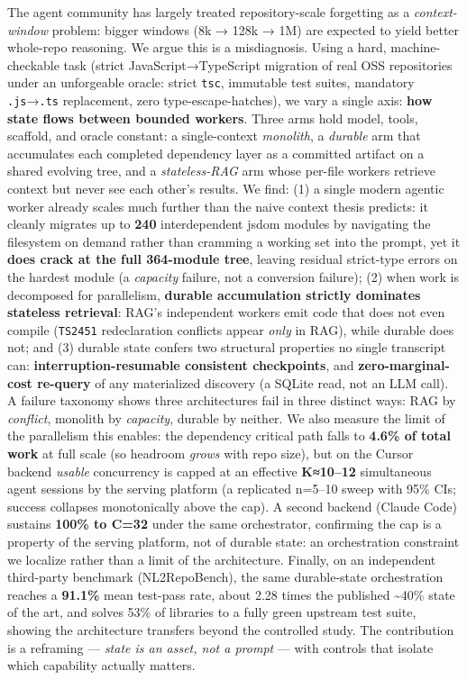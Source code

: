 \documentclass[
  10pt,
]{article}
\begin{document}
The agent community has largely treated repository-scale forgetting as a
\emph{context-window} problem: bigger windows (8k → 128k → 1M) are
expected to yield better whole-repo reasoning. We argue this is a
misdiagnosis. Using a hard, machine-checkable task (strict
JavaScript→TypeScript migration of real OSS repositories under an
unforgeable oracle: strict \texttt{tsc}, immutable test suites,
mandatory \texttt{.js}→\texttt{.ts} replacement, zero
type-escape-hatches), we vary a single axis: \textbf{how state flows
between bounded workers}. Three arms hold model, tools, scaffold, and
oracle constant: a single-context \emph{monolith}, a \emph{durable} arm
that accumulates each completed dependency layer as a committed artifact
on a shared evolving tree, and a \emph{stateless-RAG} arm whose per-file
workers retrieve context but never see each other's results. We find:
(1) a single modern agentic worker already scales much further than the
naive context thesis predicts: it cleanly migrates up to \textbf{240}
interdependent jsdom modules by navigating the filesystem on demand
rather than cramming a working set into the prompt, yet it \textbf{does
crack at the full 364-module tree}, leaving residual strict-type errors
on the hardest module (a \emph{capacity} failure, not a conversion
failure); (2) when work is decomposed for parallelism, \textbf{durable
accumulation strictly dominates stateless retrieval}: RAG's independent
workers emit code that does not even compile (\texttt{TS2451}
redeclaration conflicts appear \emph{only} in RAG), while durable does
not; and (3) durable state confers two structural properties no single
transcript can: \textbf{interruption-resumable consistent checkpoints},
and \textbf{zero-marginal-cost re-query} of any materialized discovery
(a SQLite read, not an LLM call). A failure taxonomy shows three
architectures fail in three distinct ways: RAG by \emph{conflict},
monolith by \emph{capacity}, durable by neither. We also measure the
limit of the parallelism this enables: the dependency critical path
falls to \textbf{4.6\% of total work} at full scale (so headroom
\emph{grows} with repo size), but on the Cursor backend \emph{usable}
concurrency is capped at an effective \textbf{K≈10--12} simultaneous
agent sessions by the serving platform (a replicated n=5--10 sweep with
95\% CIs; success collapses monotonically above the cap). A second
backend (Claude Code) sustains \textbf{100\% to C=32} under the same
orchestrator, confirming the cap is a property of the serving platform,
not of durable state: an orchestration constraint we localize rather
than a limit of the architecture. Finally, on an independent third-party
benchmark (NL2RepoBench), the same durable-state orchestration reaches a
\textbf{91.1\%} mean test-pass rate, about 2.28 times the published
\textasciitilde40\% state of the art, and solves 53\% of libraries to a
fully green upstream test suite, showing the architecture transfers
beyond the controlled study. The contribution is a reframing ---
\emph{state is an asset, not a prompt} --- with controls that isolate
which capability actually matters.
\end{document}
